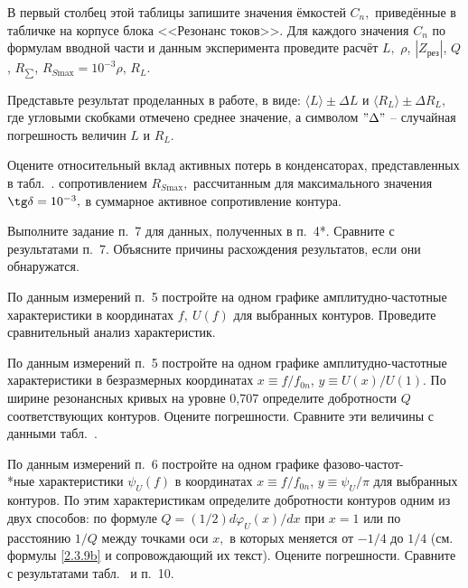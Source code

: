 \begin{lab:task}
\begin{center}
\begin{table}[h!]
\begin{center}
\begin{tabular}{|c|c|c|c|c|c|c|c|c|c|c|}
	                \hline
	            \end{tabular}
	        \end{center}
	    \end{table}
	\end{center}
В первый столбец этой таблицы запишите значения ёмкостей $C_n,$ приведённые в
табличке на корпусе блока <<Резонанс токов>>. Для каждого значения $C_n$ по
формулам вводной части и данным эксперимента проведите
 расчёт $L,$ $\rho$, $|Z_{\text{рез}}|$, $Q$,
$R_{\scriptstyle \sum}$, $R_{S \text{max}}=10^{-3}\rho$, $R_L$.

Представьте результат  проделанных в работе, в виде: $\langle L \rangle\pm\Delta L$ и
$\langle R_L\rangle\pm\Delta R_L,$ где угловыми скобками отмечено среднее
значение, а символом $"\Delta"$ – случайная погрешность величин $L$ и $R_L.$

Оцените относительный вклад активных потерь в конденсаторах, представленных в
табл.~. сопротивлением $R_{S\text{max}},$ рассчитанным для
максимального значения $\tg\delta=10^{-3},$ в суммарное активное сопротивление
контура.

\item {} Выполните задание п.~7 для данных,
полученных в п.~4*. Сравните с результатами п.~7. Объясните причины расхождения
результатов, если они обнаружатся.

\item По данным измерений п.~5 постройте на одном графике амплитудно-частотные
характеристики в координатах $f,~U(f)$   для выбранных контуров. Проведите
сравнительный анализ характеристик.

\item По данным измерений п.~5 постройте на одном графике амплитудно-частотные
характеристики в безразмерных координатах $x\equiv f/f_{0n}$, $y\equiv
U(x)/U(1).$ По ширине резонансных кривых на уровне 0,707 определите добротности
$Q$ соответствующих контуров. Оцените погрешности. Сравните эти величины с
данными табл.~.

\item По данным измерений п.~6 постройте на одном графике фазово-частот-\\*ные
характеристики $\psi_U(f)$ в координатах $x\equiv f/f_{0n}$, $y\equiv\psi_U/\pi$
для выбранных контуров. По этим характеристикам определите добротности контуров
одним из двух способов: по формуле $Q=(1/2)d\varphi_U(x)/dx$ при $x=1$ или по
расстоянию $1/Q$ между точками оси $x,$ в которых  меняется от $-1/4$ до $1/4$
(см. формулы \eqref{2.3.9b} и сопровождающий их текст). Оцените погрешности.
Сравните с результатами табл.~ и п.~10.


\end{lab:task}
